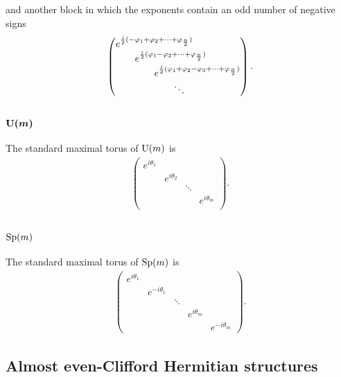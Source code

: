 \documentclass[pdftex]{sigma}
\numberwithin{equation}{section}
\begin{document}
and another block in which the exponents contain an odd number of negative signs
\begin{gather*}
\left(\begin{array}{@{}l@{}}
e^{{i\over 2}(-\varphi_1+\varphi_2+\cdots+\varphi_{{n\over 2}})} \\
\qquad e^{{i\over 2}(\varphi_1-\varphi_2+\cdots+\varphi_{{n\over 2}})} \\
\qquad\qquad e^{{i\over 2}(\varphi_1+\varphi_2-\varphi_3+\cdots+\varphi_{{n\over 2}})} \\
\qquad\qquad\qquad \ddots
 \end{array}\right).
\end{gather*}

\subsubsection[${\rm U}(m)$]{$\boldsymbol{{\rm U}(m)}$}

The standard maximal torus of ${\rm U}(m)$ is
\begin{gather*}\left(
\begin{matrix}
e^{i\theta_1} & & & \\
 & e^{i\theta_2} & & \\
 & & \ddots & \\
 & & & e^{i\theta_m}\\
 & & &
\end{matrix}
\right).
\end{gather*}

\subsubsection{${\rm Sp}(m)$}

The standard maximal torus of ${\rm Sp}(m)$ is
\begin{gather*}\left(
\begin{matrix}
e^{i\theta_1} & & & & \\
 & e^{-i\theta_1} & & & \\
 & & \ddots & & \\
 & & & e^{i\theta_m} & \\
 & & & & e^{-i\theta_m}
\end{matrix}
\right).
\end{gather*}

\subsection{Almost even-Clif\/ford Hermitian structures}
\end{document}
